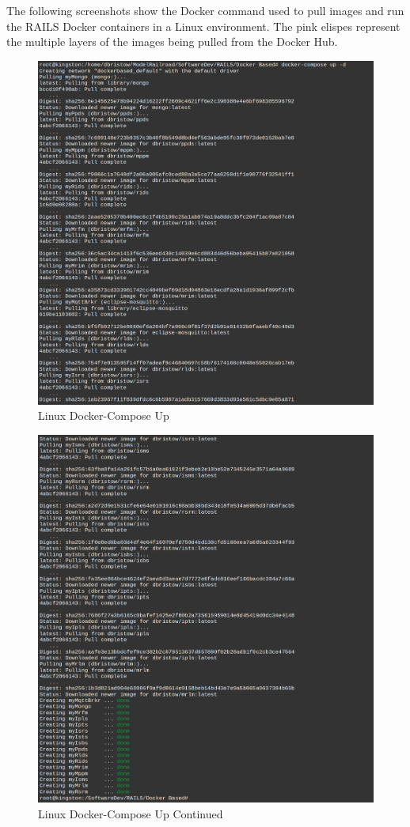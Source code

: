 The following screenshots show the Docker command used to pull images and run the \ac{RAILS} Docker containers in a Linux environment. The pink elispes represent the multiple layers of the images being pulled from the Docker Hub.
\begin{figure}[H]
    \centering
    \includegraphics[scale=0.44]{win2l.png}
    \caption{Linux Docker-Compose Up}
    \label{fig:linux-docker-cmds-2}
\end{figure}
\begin{figure}[H]
    \centering
    \includegraphics[scale=0.44]{win3l.png}
    \caption{Linux Docker-Compose Up Continued}
    \label{fig:linux-docker-cmds-3}
\end{figure}
